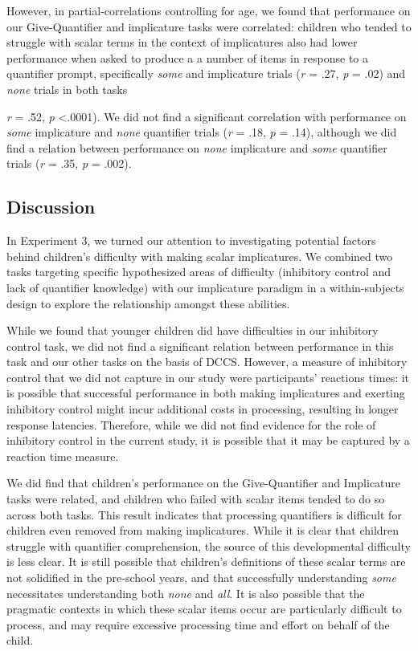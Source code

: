 \documentclass[man]{apa2}
\begin{document}
However, in partial-correlations controlling for age, we found that performance on our Give-Quantifier and implicature tasks were correlated: children who tended to struggle with scalar terms in the context of implicatures also had lower performance when asked to produce a a number of items in response to a quantifier prompt, specifically \textit{some} and implicature trials (\textit{r} = .27, \textit{p} = .02) and \textit{none} trials in both tasks {\textit{r} = .52, \textit{p} \textless .0001). We did not find a significant correlation with performance on \textit{some} implicature and \textit{none} quantifier trials (\textit{r} = .18, \textit{p} = .14), although we did find a relation between performance on \textit{none} implicature and \textit{some} quantifier trials (\textit{r} = .35, \textit{p} = .002). 



\subsection{Discussion}

In Experiment 3, we turned our attention to investigating potential factors behind children's difficulty with making scalar implicatures. We combined two tasks targeting specific hypothesized areas of difficulty (inhibitory control and lack of quantifier knowledge) with our implicature paradigm in a within-subjects design to explore the relationship amongst these abilities. 

While we found that younger children did have difficulties in our inhibitory control task, we did not find a significant relation between performance in this task and our other tasks on the basis of DCCS. However, a measure of inhibitory control that we did not capture in our study were participants' reactions times: it is possible that successful performance in both making implicatures and exerting inhibitory control might incur additional costs in processing, resulting in longer response latencies. Therefore, while we did not find evidence for the role of inhibitory control in the current study, it is possible that it may be captured by a reaction time measure. 

We did find that children's performance on the Give-Quantifier and Implicature tasks were related, and children who failed with scalar items tended to do so across both tasks. This result indicates that processing quantifiers is difficult for children even removed from making implicatures. While it is clear that children struggle with quantifier comprehension, the source of this developmental difficulty is less clear. It is still possible that children's definitions of these scalar terms are not solidified in the pre-school years, and that successfully understanding \textit{some} necessitates understanding both \textit{none} and \textit{all}. It is also possible that the pragmatic contexts in which these scalar items occur are particularly difficult to process, and may require excessive processing time and effort on behalf of the child. 

}
\end{document}
